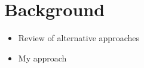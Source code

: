 \chapter{Background}
\label{chap:background}

\begin{itemize}
\item Review of alternative approaches
\item My approach
\end{itemize}


